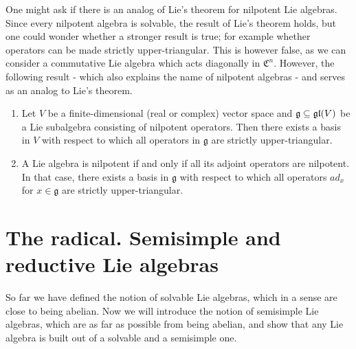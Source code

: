 \documentclass{report}
\begin{document}
One might ask if there is an analog of Lie's theorem for nilpotent Lie algebras.
Since every nilpotent algebra is solvable, the result of Lie's theorem holds, but one could wonder whether a stronger result is true; for example whether operators can be made strictly upper-triangular.
This is however false, as we can consider a commutative Lie algebra which acts diagonally in $\mathfrak C^n$.
However, the following result - which also explains the name of nilpotent algebras - and serves as an analog to Lie's theorem. 
\begin{theorem}\label{thm:engel}
    \begin{enumerate}[label = (\roman*)]
        \item Let $V$ be a finite-dimensional (real or complex) vector space and $\mathfrak g \subseteq \operatorname{{\mathfrak{gl}}}(V)$ be a Lie subalgebra consisting of nilpotent operators.
        Then there exists a basis in $V$ with respect to which all operators in $\mathfrak g$ are strictly upper-triangular.
        \item A Lie algebra is nilpotent if and only if all its adjoint operators are nilpotent.
        In that case, there exists a basis in $\mathfrak g$ with respect to which all operators $ad_x$ for $x \in \mathfrak g$ are strictly upper-triangular.
    \end{enumerate}
\end{theorem}

\section{The radical. Semisimple and reductive Lie algebras}
So far we have defined the notion of solvable Lie algebras, which in a sense are close to being abelian.
Now we will introduce the notion of semisimple Lie algebras, which are as far as possible from being abelian, and show that any Lie algebra is built out of a solvable and a semisimple one.
\end{document}
